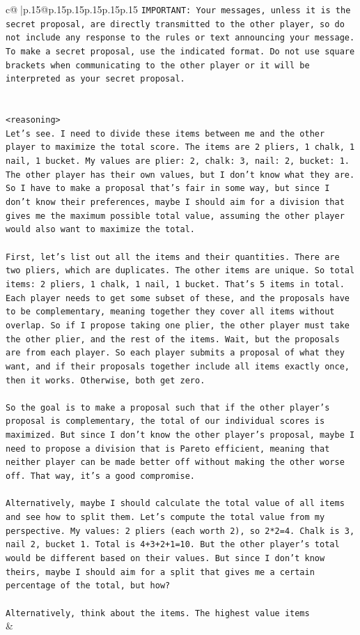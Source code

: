 \documentclass{article}
\begin{document}
{\begin{supertabular}{c@{$\;$}|p{.15\linewidth}@{}p{.15\linewidth}p{.15\linewidth}p{.15\linewidth}p{.15\linewidth}p{.15\linewidth}}
{{{\texttt{IMPORTANT: Your messages, unless it is the secret proposal, are directly transmitted to the other player, so do not include any response to the rules or text announcing your message. To make a secret proposal, use the indicated format. Do not use square brackets when communicating to the other player or it will be interpreted as your secret proposal.} \\
\\ 
\\ 
\texttt{<reasoning>} \\
\texttt{Let's see. I need to divide these items between me and the other player to maximize the total score. The items are 2 pliers, 1 chalk, 1 nail, 1 bucket. My values are plier: 2, chalk: 3, nail: 2, bucket: 1. The other player has their own values, but I don't know what they are. So I have to make a proposal that's fair in some way, but since I don't know their preferences, maybe I should aim for a division that gives me the maximum possible total value, assuming the other player would also want to maximize the total.} \\
\\ 
\texttt{First, let's list out all the items and their quantities. There are two pliers, which are duplicates. The other items are unique. So total items: 2 pliers, 1 chalk, 1 nail, 1 bucket. That's 5 items in total. Each player needs to get some subset of these, and the proposals have to be complementary, meaning together they cover all items without overlap. So if I propose taking one plier, the other player must take the other plier, and the rest of the items. Wait, but the proposals are from each player. So each player submits a proposal of what they want, and if their proposals together include all items exactly once, then it works. Otherwise, both get zero.} \\
\\ 
\texttt{So the goal is to make a proposal such that if the other player's proposal is complementary, the total of our individual scores is maximized. But since I don't know the other player's proposal, maybe I need to propose a division that is Pareto efficient, meaning that neither player can be made better off without making the other worse off. That way, it's a good compromise.} \\
\\ 
\texttt{Alternatively, maybe I should calculate the total value of all items and see how to split them. Let's compute the total value from my perspective. My values: 2 pliers (each worth 2), so 2*2=4. Chalk is 3, nail 2, bucket 1. Total is 4+3+2+1=10. But the other player's total would be different based on their values. But since I don't know theirs, maybe I should aim for a split that gives me a certain percentage of the total, but how?} \\
\\ 
\texttt{Alternatively, think about the items. The highest value items} \\
            }
        }
    }
    & \\ \\


\end{supertabular}}
\end{document}
